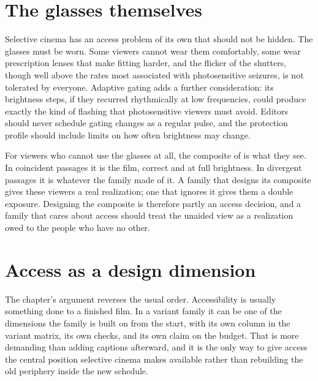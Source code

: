 \section{The glasses themselves}

Selective cinema has an access problem of its own that should not be hidden. The glasses must be worn. Some viewers cannot wear them comfortably, some wear prescription lenses that make fitting harder, and the flicker of the shutters, though well above the rates most associated with photosensitive seizures, is not tolerated by everyone. Adaptive gating adds a further consideration: its brightness steps, if they recurred rhythmically at low frequencies, could produce exactly the kind of flashing that photosensitive viewers must avoid. Editors should never schedule gating changes as a regular pulse, and the protection profile should include limits on how often brightness may change.

For viewers who cannot use the glasses at all, the composite of  is what they see. In coincident passages it is the film, correct and at full brightness. In divergent passages it is whatever the family made of it. A family that designs its composite gives these viewers a real realization; one that ignores it gives them a double exposure. Designing the composite is therefore partly an access decision, and a family that cares about access should treat the unaided view as a realization owed to the people who have no other.

\section{Access as a design dimension}

The chapter's argument reverses the usual order. Accessibility is usually something done to a finished film. In a variant family it can be one of the dimensions the family is built on from the start, with its own column in the variant matrix, its own checks, and its own claim on the budget. That is more demanding than adding captions afterward, and it is the only way to give access the central position selective cinema makes available rather than rebuilding the old periphery inside the new schedule.
